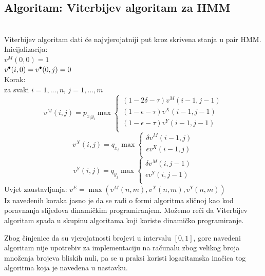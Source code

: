 \documentclass[a4paper]{article}
\newcommand\tab[1][1cm]{\hspace*{#1}}
\newcommand\sbullet[1][.5]{\mathbin{\vcenter{\hbox{\scalebox{#1}{$\bullet$}}}}}
\begin{document}
\subsection{Algoritam: Viterbijev algoritam za HMM \cite{hmm_algorithms}}
\\
Viterbijev algoritam dati će najvjerojatniji put kroz skrivena stanja u pair HMM. 
\newline\newline
Inicijalizacija: \\
\tab \tab $v^M(0,0) = 1$\\
\tab \tab $v^{\sbullet[.75]}(i,0) = v^{\sbullet[.75]}(0,j) = 0$\\
Korak:\\
\tab za svaki $i=1,...,n$, $j=1,...,m$ \\
\begin{equation}
     v^M(i,j) = p_{x_iy_i} \max
    \begin{cases}
      (1 - 2\delta - \tau)v^M(i-1,j-1)\\
      (1-\epsilon-\tau)v^X(i-1,j-1)\\
      (1-\epsilon - \tau)v^Y(i-1,j-1)\\          
    \end{cases}
\end{equation}
\begin{equation}
     v^X(i,j) = q_{x_i}\max
    \begin{cases}
      \delta v^M(i-1,j)\\
      \epsilon v^X(i-1,j)\\
    \end{cases}   
\end{equation}
\begin{equation}
     v^Y(i,j) = q_{y_j}\max
    \begin{cases}
      \delta v^M(i,j-1)\\
      \epsilon v^Y(i,j-1)\\
    \end{cases}   
\end{equation}
Uvjet zaustavljanja:
$v^E = \max(v^M(n,m), v^X(n,m), v^Y(n,m))$ \\

\noindent
Iz navedenih koraka jasno je da se radi o formi algoritma sličnoj kao kod poravnanja slijedova dinamičkim programiranjem. Možemo reči da Viterbijev algoritam spada u skupinu algoritama koji koriste dinamičko programiranje.

\noindent
Zbog činjenice da su vjerojatnosti brojevi u intervalu $[0,1]$, gore navedeni algoritam nije upotrebiv za implementaciju na računalu zbog velikog broja množenja brojeva bliskih nuli, pa se u praksi koristi logaritamska inačica tog algoritma koja je navedena u nastavku.  
\end{document}
